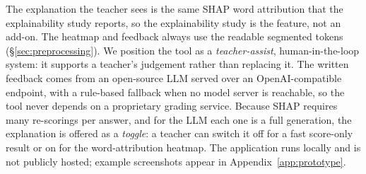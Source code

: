 The explanation the teacher sees is the same SHAP word attribution that the explainability study
reports, so the explainability study is the feature, not an add-on. The heatmap and feedback always
use the readable segmented tokens (\S\ref{sec:preprocessing}). We
position the tool as a \emph{teacher-assist}, human-in-the-loop system: it supports a teacher's
judgement rather than replacing it. The written feedback comes from an open-source LLM served over an
OpenAI-compatible endpoint, with a rule-based fallback when no model server is reachable, so the tool
never depends on a proprietary grading service. Because SHAP requires many re-scorings per answer, and
for the LLM each one is a full generation, the explanation is offered as a \emph{toggle}: a teacher can
switch it off for a fast score-only result or on for the word-attribution heatmap. The application runs
locally and is not publicly hosted; example screenshots appear in Appendix~\ref{app:prototype}.
